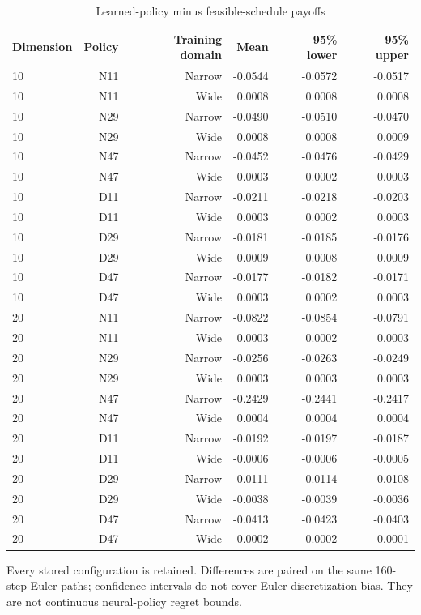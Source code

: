 \begin{table}[htbp]
\centering\small\setlength{\tabcolsep}{4pt}
\caption{Learned-policy minus feasible-schedule payoffs}\label{tab:r9schedulepairs}
\begin{tabular}{lrrrrr}
\toprule
Dimension & Policy & Training domain & Mean & 95\% lower & 95\% upper \\
\midrule
10 & N11 & Narrow & -0.0544 & -0.0572 & -0.0517 \\
10 & N11 & Wide & 0.0008 & 0.0008 & 0.0008 \\
10 & N29 & Narrow & -0.0490 & -0.0510 & -0.0470 \\
10 & N29 & Wide & 0.0008 & 0.0008 & 0.0009 \\
10 & N47 & Narrow & -0.0452 & -0.0476 & -0.0429 \\
10 & N47 & Wide & 0.0003 & 0.0002 & 0.0003 \\
10 & D11 & Narrow & -0.0211 & -0.0218 & -0.0203 \\
10 & D11 & Wide & 0.0003 & 0.0002 & 0.0003 \\
10 & D29 & Narrow & -0.0181 & -0.0185 & -0.0176 \\
10 & D29 & Wide & 0.0009 & 0.0008 & 0.0009 \\
10 & D47 & Narrow & -0.0177 & -0.0182 & -0.0171 \\
10 & D47 & Wide & 0.0003 & 0.0002 & 0.0003 \\
20 & N11 & Narrow & -0.0822 & -0.0854 & -0.0791 \\
20 & N11 & Wide & 0.0003 & 0.0002 & 0.0003 \\
20 & N29 & Narrow & -0.0256 & -0.0263 & -0.0249 \\
20 & N29 & Wide & 0.0003 & 0.0003 & 0.0003 \\
20 & N47 & Narrow & -0.2429 & -0.2441 & -0.2417 \\
20 & N47 & Wide & 0.0004 & 0.0004 & 0.0004 \\
20 & D11 & Narrow & -0.0192 & -0.0197 & -0.0187 \\
20 & D11 & Wide & -0.0006 & -0.0006 & -0.0005 \\
20 & D29 & Narrow & -0.0111 & -0.0114 & -0.0108 \\
20 & D29 & Wide & -0.0038 & -0.0039 & -0.0036 \\
20 & D47 & Narrow & -0.0413 & -0.0423 & -0.0403 \\
20 & D47 & Wide & -0.0002 & -0.0002 & -0.0001 \\
\bottomrule
\end{tabular}
\par\vspace{3pt}\begin{minipage}{0.97\linewidth}\footnotesize Every stored configuration is retained. Differences are paired on the same 160-step Euler paths; confidence intervals do not cover Euler discretization bias. They are not continuous neural-policy regret bounds.\end{minipage}
\end{table}
